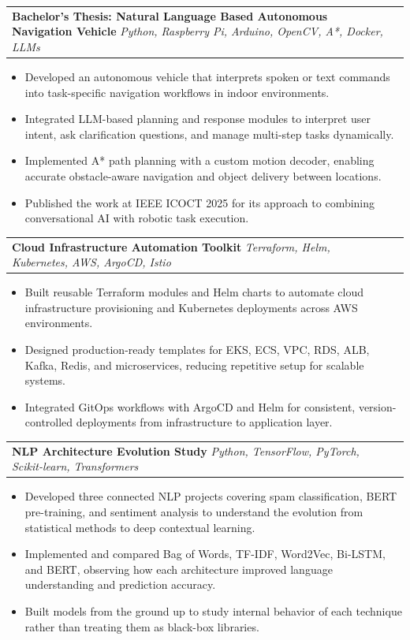 \documentclass[a4paper,11pt]{article}
\makeatletter
\newcommand{\GitHubIcon}{\faGithub}
\newcommand{\GitHubIcon}{\textbf{GH}}
\newcommand{\cventry}[5][]{%
  \begin{samepage}
  \begin{tabularx}{\linewidth}{@{}X r@{}}
    \textbf{#2} \textit{\small\color{lightgray}#3} & \small\color{lightgray}#4 \ifthenelse{\equal{#1}{}}{}{\hspace{0.3em}\textcolor{accent}{#1}} \\
  \end{tabularx}%
  \vspace{1pt}
  \begin{itemize}[nosep, leftmargin=1.2em, itemsep=2pt, topsep=1pt, label={\small\textbullet}]
    #5
  \end{itemize}
  \vspace{4pt}
  \end{samepage}
}
\makeatother
\begin{document}
\cventry[\href{https://github.com/KoteshwarChinnolla/A_robotic_vehicle}{\GitHubIcon}]{Bachelor's Thesis: Natural Language Based Autonomous Navigation Vehicle}{\normalfont\small Python, Raspberry Pi, Arduino, OpenCV, A*, Docker, LLMs}{}{\item Developed an autonomous vehicle that interprets spoken or text commands into task-specific navigation workflows in indoor environments.
  \item Integrated LLM-based planning and response modules to interpret user intent, ask clarification questions, and manage multi-step tasks dynamically.
  \item Implemented A* path planning with a custom motion decoder, enabling accurate obstacle-aware navigation and object delivery between locations.
  \item Published the work at IEEE ICOCT 2025 for its approach to combining conversational AI with robotic task execution.
}

\cventry[\href{https://github.com/KoteshwarChinnolla/terraform-modules}{\GitHubIcon - Terraform} \href{https://github.com/KoteshwarChinnolla/helm-utilities}{\GitHubIcon - HELM}]{Cloud Infrastructure Automation Toolkit}{\normalfont\small Terraform, Helm, Kubernetes, AWS, ArgoCD, Istio}{}{\item Built reusable Terraform modules and Helm charts to automate cloud infrastructure provisioning and Kubernetes deployments across AWS environments.
  \item Designed production-ready templates for EKS, ECS, VPC, RDS, ALB, Kafka, Redis, and microservices, reducing repetitive setup for scalable systems.
  \item Integrated GitOps workflows with ArgoCD and Helm for consistent, version-controlled deployments from infrastructure to application layer.
}
\pagebreak
\cventry[\href{https://github.com/KoteshwarChinnolla/BERT-Pre-training}{\GitHubIcon - BERT } \href{https://github.com/KoteshwarChinnolla/spam-classification-Bow-Tfidf-word_2_vec-ML-LSTM}{\GitHubIcon - NLP Techniques} \href{https://github.com/KoteshwarChinnolla/sentiment-analysis-on-IMDB-using-different-RNN-s-techniques}{\GitHubIcon - RNNs}]{NLP Architecture Evolution Study}{\normalfont\small Python, TensorFlow, PyTorch, Scikit-learn, Transformers}{}{\item Developed three connected NLP projects covering spam classification, BERT pre-training, and sentiment analysis to understand the evolution from statistical methods to deep contextual learning.
  \item Implemented and compared Bag of Words, TF-IDF, Word2Vec, Bi-LSTM, and BERT, observing how each architecture improved language understanding and prediction accuracy.
  \item Built models from the ground up to study internal behavior of each technique rather than treating them as black-box libraries.
}
\end{document}
